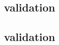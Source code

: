 \begin{sbmlenum}

\end{sbmlenum} \subsection*{ validation} \begin{sbmlenum}


\end{sbmlenum} \subsection*{ validation} \begin{sbmlenum}


\end{sbmlenum}

